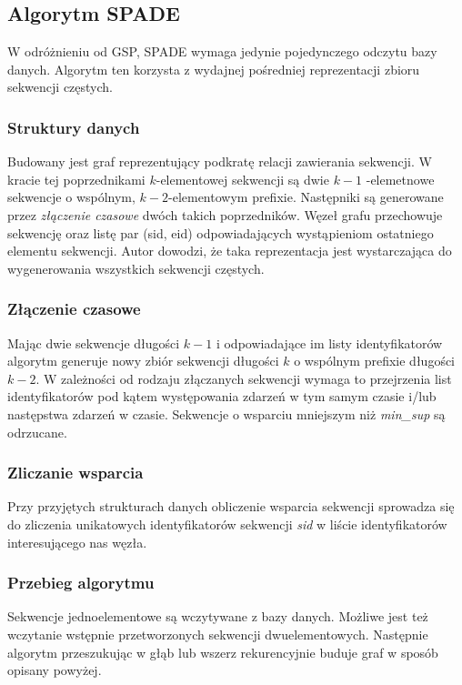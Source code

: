 \documentclass[paper=a4, fontsize=11pt]{scrartcl} %
\numberwithin{equation}{section} %
\numberwithin{figure}{section} %
\numberwithin{table}{section} %
\begin{document}
\subsection{Algorytm SPADE}
W odróżnieniu od GSP, SPADE wymaga jedynie pojedynczego odczytu bazy danych.
Algorytm ten korzysta z wydajnej pośredniej reprezentacji zbioru sekwencji
częstych.

\subsubsection{Struktury danych}
Budowany jest graf reprezentujący podkratę relacji zawierania sekwencji.  W
kracie tej poprzednikami \( k \)-elementowej sekwencji są dwie \( k-1 \)
-elemetnowe sekwencje o wspólnym, \( k-2 \)-elementowym prefixie.  Następniki
są generowane przez {\em złączenie czasowe} dwóch takich poprzedników.  Węzeł
grafu przechowuje sekwencję oraz listę par (sid, eid) odpowiadających
wystąpieniom ostatniego elementu sekwencji.  Autor dowodzi, że taka
reprezentacja jest wystarczająca do wygenerowania wszystkich sekwencji częstych.

\subsubsection{Złączenie czasowe}
Mając dwie sekwencje długości \( k-1 \) i odpowiadające im listy
identyfikatorów algorytm generuje nowy zbiór sekwencji długości \( k \)
o wspólnym prefixie długości \( k-2 \).  W zależności od rodzaju złączanych
sekwencji wymaga to przejrzenia list identyfikatorów pod kątem występowania
zdarzeń w tym samym czasie i/lub następstwa zdarzeń w czasie.  Sekwencje
o wsparciu mniejszym niż {\em min\_sup} są odrzucane.

\subsubsection{Zliczanie wsparcia}
Przy przyjętych strukturach danych obliczenie wsparcia sekwencji sprowadza się
do zliczenia unikatowych identyfikatorów sekwencji {\em sid} w liście
identyfikatorów interesującego nas węzła.

\subsubsection{Przebieg algorytmu}
Sekwencje jednoelementowe są wczytywane z bazy danych.  Możliwe jest też
wczytanie wstępnie przetworzonych sekwencji dwuelementowych.  Następnie algorytm
przeszukując w głąb lub wszerz rekurencyjnie buduje graf w sposób opisany powyżej.
\end{document}
